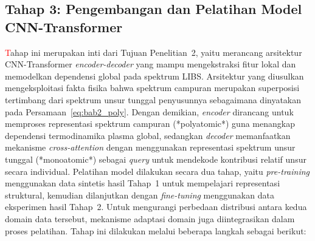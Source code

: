 \subsection{Tahap 3: Pengembangan dan Pelatihan Model CNN-Transformer}

\textcolor{red}{T}ahap ini merupakan inti dari Tujuan Penelitian~2, yaitu merancang arsitektur CNN-Transformer \textit{encoder-decoder} yang mampu mengekstraksi fitur lokal dan memodelkan dependensi global pada spektrum LIBS. Arsitektur yang diusulkan mengeksploitasi fakta fisika bahwa spektrum campuran merupakan superposisi tertimbang dari spektrum unsur tunggal penyusunnya sebagaimana dinyatakan pada Persamaan~\ref{eq:bab2_poly}. Dengan demikian, \textit{encoder} dirancang untuk memproses representasi spektrum campuran (*polyatomic*) guna menangkap dependensi termodinamika plasma global, sedangkan \textit{decoder} memanfaatkan mekanisme \textit{cross-attention} dengan menggunakan representasi spektrum unsur tunggal (*monoatomic*) sebagai \textit{query} untuk mendekode kontribusi relatif unsur secara individual. Pelatihan model dilakukan secara dua tahap, yaitu \textit{pre-training} menggunakan data sintetis hasil Tahap~1 untuk mempelajari representasi struktural, kemudian dilanjutkan dengan \textit{fine-tuning} menggunakan data eksperimen hasil Tahap~2. Untuk mengurangi perbedaan distribusi antara kedua domain data tersebut, mekanisme adaptasi domain juga diintegrasikan dalam proses pelatihan. Tahap ini dilakukan melalui beberapa langkah sebagai berikut:

